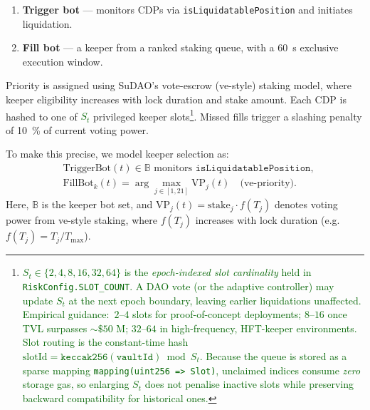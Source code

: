 \documentclass[11pt]{article}
\begin{document}
\begin{enumerate}[label=\textbf{\arabic*.},wide, labelindent=0pt]
  \item \textbf{Trigger bot} — monitors CDPs via \texttt{isLiquidatablePosition} and initiates liquidation.
  \item \textbf{Fill bot} — a keeper from a ranked staking queue, with a \SI{60}{\second} exclusive execution window.
\end{enumerate}

Priority is assigned using SuDAO's vote-escrow (ve-style) staking model, where keeper eligibility increases with lock duration and stake amount. 
Each CDP is hashed to one of \textcolor{darkgreen}{$S_{t}$} privileged keeper slots\footnote{\textcolor{darkgreen}{%
\(S_{t}\!\in\!\{2,4,8,16,32,64\}\) is the \emph{epoch-indexed slot cardinality} held in \texttt{RiskConfig.SLOT\_COUNT}.  
A DAO vote (or the adaptive controller) may update \(S_{t}\) at the next epoch boundary, leaving earlier liquidations unaffected. Empirical guidance: \(\,2{\text{–}}4\) slots for proof-of-concept deployments; \(8{\text{–}}16\) once TVL surpasses \(\sim\$50\) M; \(32{\text{–}}64\) in high-frequency, HFT-keeper environments.  Slot routing is the constant-time hash  
\(\mathrm{slotId}=\mathtt{keccak256(vaultId)}\bmod S_{t}\).  
Because the queue is stored as a sparse mapping \texttt{mapping(uint256~=>~Slot)}, unclaimed indices consume \emph{zero} storage gas, so enlarging \(S_{t}\) does not penalise inactive slots while preserving backward compatibility for historical ones.}}. Missed fills trigger a slashing penalty of \SI{10}{\percent} of current voting power.

\medskip

To make this precise, we model keeper selection as:
\begin{align*}
&\text{TriggerBot}(t) \in \mathbb{B} \text{ monitors } \texttt{isLiquidatablePosition}, \\
&\text{FillBot}_k(t) = \arg\max_{j \in[1,21]} \text{VP}_j(t) \quad \text{(ve-priority)}.
\end{align*}
Here, \( \mathbb{B} \) is the keeper bot set, and \( \text{VP}_j(t) = \text{stake}_j \cdot f(T_j) \) denotes voting power from ve-style staking, where \( f(T_j) \) increases with lock duration (e.g. \( f(T_j) = T_j / T_{\max} \)).
\end{document}
